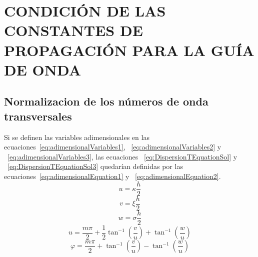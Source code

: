 \documentclass[letterpaper, 10 pt, conference]{ieeeconf}  %
\begin{document}
\section{CONDICI\'ON DE LAS CONSTANTES DE PROPAGACI\'ON PARA LA GU\'IA DE ONDA}
\subsection{Normalizacion de los n\'umeros de onda transversales} 
Si se definen las variables adimensionales  en las ecuaciones~\eqref{eq:adimensionalVariables1}, ~\eqref{eq:adimensionalVariables2} y ~\eqref{eq:adimensionalVariables3}, las ecuaciones ~\eqref{eq:DispersionTEquationSol} y ~\eqref{eq:DispersionTEquationSol3} quedar\'ian definidas por las ecuaciones~\eqref{eq:adimensionalEquation1} y ~\eqref{eq:adimensionalEquation2}.
\begin{equation}
\label{eq:adimensionalVariables1}
u = \kappa \frac{h}{2}
\end{equation}
\begin{equation}
\label{eq:adimensionalVariables2}
v = \xi \frac{h}{2}
\end{equation}
\begin{equation}
\label{eq:adimensionalVariables3}
w = \sigma \frac{h}{2}
\end{equation}
\begin{equation}
\label{eq:adimensionalEquation1}
u = \frac{{m\pi }}{2} + \frac{1}{2}{\tan ^{ - 1}}(\frac{v}{u}) + {\tan ^{ - 1}}(\frac{w}{u})
\end{equation}
\begin{equation}
\label{eq:adimensionalEquation2}
\varphi  = \frac{{m\pi }}{2} + {\tan ^{ - 1}}(\frac{v}{u}) - {\tan ^{ - 1}}(\frac{w}{u})
\end{equation}
\end{document}

